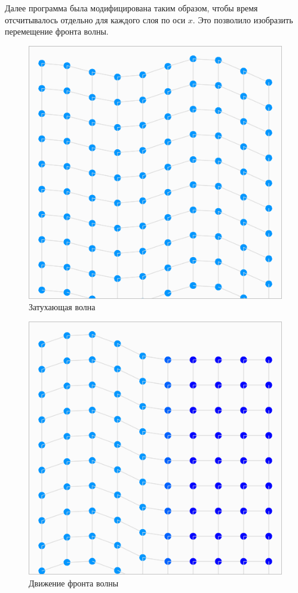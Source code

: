 \documentclass[12pt]{article}
\begin{document}
Далее программа была модифицирована таким образом, чтобы время отсчитывалось отдельно для каждого слоя по оси $x$. Это позволило изобразить перемещение фронта волны.

\begin{figure}[ht]
	\label{fig:pic1}
	\caption{Затухающая волна}
	\centering
		\includegraphics[width=0.5\columnwidth]{wd.png}
\end{figure}

\begin{figure}[ht]
	\label{fig:pic2}
	\caption{Движение фронта волны}
	\centering
		\includegraphics[width=0.5\columnwidth]{wd2.png}
\end{figure}
\end{document}
